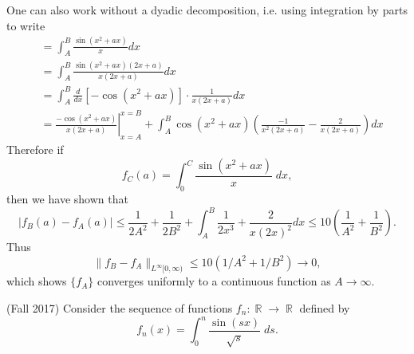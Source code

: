 \documentclass{exam}
\DeclareMathOperator{\RR}{\mathbb{R}}
\theoremstyle{problemstyle}
\newcommand{\1}[1]{\textbf{1}_{\left[#1\right]}} %
\begin{document}
\begin{questions}
\begin{solution}
	One can also work without a dyadic decomposition, i.e. using integration by parts to write
  \begin{align*}
      &= \int_{A}^{B}\frac{\sin(x^{2}+ax)}{x}dx\\ 
      &= \int_{A}^{B}\frac{\sin(x^{2}+ax)(2x+a)}{x(2x+a)}dx\\
      &= \int_{A}^{B} \frac{d}{dx}\left[ -\cos(x^{2}+ax) \right] \cdot \frac{1}{x(2x+a)}dx\\
      &= \left.\frac{-\cos(x^{2}+ax)}{x(2x+a)}\right|^{x=B}_{x=A} + \int_{A}^{B}\cos(x^{2}+ax)\left( \frac{-1}{x^{2}(2x+a)}-\frac{2}{x(2x+a)} \right)  dx
    \end{align*}
    Therefore if
    \[ f_C(a) = \int_0^C \frac{\sin(x^2 + ax)}{x}\; dx, \]
    then we have shown that
    \begin{equation*}
      \left|   f_{B}(a)-f_{A}(a) \right|
      \leq \frac{1}{2A^{2}}+ \frac{1}{2B^{2}} + \int_{A}^{B}\frac{1}{2x^{3}}+ \frac{2}{x(2x)^{2}} dx
      \leq 10 \left( \frac{1}{A^{2}}+\frac{1}{B^{2}}  \right).
    \end{equation*}
    Thus
    \[ \| f_B - f_A \|_{L^\infty[0,\infty)} \leq 10 (1/A^2 + 1/B^2) \to 0, \]
    which shows $\{ f_A \}$ converges uniformly to a continuous function as $A \to \infty$.
\end{solution}

\question (Fall 2017) Consider the sequence of functions $f_n: \RR \to \RR$ defined by
%
\[ f_n(x) = \int_0^n \frac{\sin(sx)}{\sqrt{s}}\; ds. \]
%
\end{questions}
\end{document}
